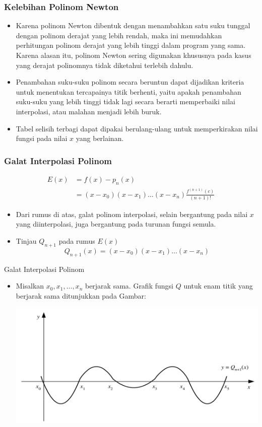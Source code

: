 \documentclass[pdflatex,compress,mathserif]{beamer}
\begin{document}
\begin{frame}
	\frametitle{Kelebihan Polinom Newton}
	\begin{itemize}
		\item Karena polinom Newton dibentuk dengan menambahkan satu suku tunggal dengan polinom derajat yang lebih rendah, maka ini memudahkan perhitungan polinom derajat yang lebih tinggi dalam program yang sama. Karena alasan itu, polinom Newton sering digunakan khususnya pada kasus yang derajat polinomnya tidak diketahui terlebih dahulu.
		\item Penambahan suku-suku polinom secara beruntun dapat dijadikan kriteria untuk menentukan tercapainya titik berhenti, yaitu apakah penambahan suku-suku yang lebih tinggi tidak lagi secara berarti memperbaiki nilai interpolasi, atau malahan menjadi lebih buruk.
		\item Tabel selisih terbagi dapat dipakai berulang-ulang untuk memperkirakan nilai fungsi pada nilai $ x $ yang berlainan.
	\end{itemize}
\end{frame}

\begin{frame}
	\frametitle{Galat Interpolasi Polinom}
	\begin{align*}
		E(x) &= f(x) - p_n(x)\\
		&= (x - x_0) (x - x_1) ... (x - x_n) \frac{f^{(n+1)}(c)}{(n+1)!}
	\end{align*}
	\begin{itemize}
		\item Dari rumus di atas, galat polinom interpolasi, selain bergantung pada nilai $ x $ yang diinterpolasi, juga bergantung pada turunan fungsi semula.
		\item Tinjau $ Q_{n+1} $ pada rumus $ E(x) $
		\[ Q_{n+1}(x) = (x - x_0)(x - x_1) \dots (x - x_n) \]
	\end{itemize}
\end{frame}

\begin{frame}{Galat Interpolasi Polinom}
	\begin{itemize}
		\item Misalkan $ x_0, x_1 , \dots, x_n $ berjarak sama. Grafik fungsi $ Q $ untuk enam titik yang berjarak sama ditunjukkan pada Gambar:
		\begin{center}
			\includegraphics[width=0.8\linewidth]{img/img16}
		\end{center}
	\end{itemize}
\end{frame}
\end{document}

